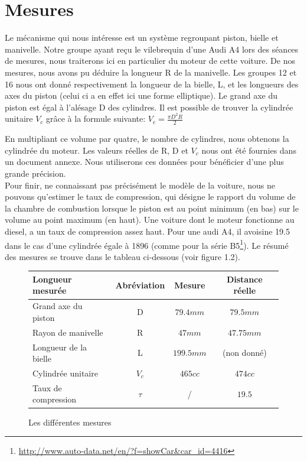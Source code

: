 \documentclass[a4paper,oneside,12pt]{report}
\begin{document}

\section{Mesures}

Le mécanisme qui nous intéresse est un système regroupant piston, bielle et manivelle. Notre groupe ayant reçu le vilebrequin d'une Audi A4 lors des séances de mesures, nous traiterons ici en particulier du moteur de cette voiture. De nos mesures, nous avons pu déduire la longueur R de la manivelle. Les groupes 12 et 16 nous ont donné respectivement la longueur de la bielle, L, et les longueurs des axes du piston (celui ci a en effet ici une forme elliptique). Le grand axe du piston est égal à l'alésage D des cylindres. Il est possible de trouver la cylindrée unitaire $V_c$ grâce à la formule suivante: 
$V_c =\frac{\pi D^2 R}{2}$

En multipliant ce volume par quatre, le nombre de cylindres, nous obtenons la cylindrée du moteur. Les valeurs réelles de R, D et $V_c$ nous ont été fournies dans un document annexe. Nous utiliserons ces données pour bénéficier d'une plus grande précision.\\

Pour finir, ne connaissant pas précisément le modèle de la voiture, nous ne pouvons qu'estimer le taux de compression, qui désigne le rapport du volume de la chambre de combustion lorsque le piston est au point minimum (en bas) sur le volume au point maximum (en haut). Une voiture dont le moteur fonctionne au diesel, a un taux de compression assez haut. Pour une audi A4, il avoisine 19.5 dans le cas d'une cylindrée égale à 1896 (comme pour la série
B5\footnote{\url{http://www.auto-data.net/en/?f=showCar&car_id=4416}}). Le résumé des mesures se trouve dans le tableau ci-dessous (voir figure 1.2).

\begin{figure}[h]
\centering
\begin{tabular}{|l|c|c|c|}
  \hline
  Longueur mesurée & Abréviation & Mesure & Distance réelle\\
  \hline
  Grand axe du piston & D & $79.4mm$ & $79.5mm$ \\
  Rayon de manivelle & R & $47mm$ & $47.75mm$\\
  Longueur de la bielle & L & $199.5mm$ & (non donné)\\
  Cylindrée unitaire & $V_c$  & $465cc$ & $474cc$\\
  Taux de compression & $\tau$ & / & $19.5$\\
  \hline
\end{tabular}
\caption{Les différentes mesures}
\end{figure}
\end{document}
